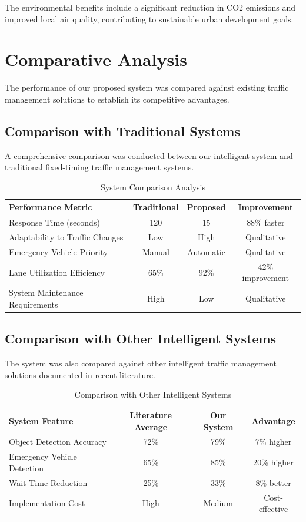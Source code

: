 The environmental benefits include a significant reduction in CO2 emissions and improved local air quality, contributing to sustainable urban development goals.

\section{Comparative Analysis}
\label{sec:comparative_analysis}

The performance of our proposed system was compared against existing traffic management solutions to establish its competitive advantages.

\subsection{Comparison with Traditional Systems}
A comprehensive comparison was conducted between our intelligent system and traditional fixed-timing traffic management systems.

\begin{table}[h]
\centering
\caption{System Comparison Analysis}
\label{tab:system_comparison}
\begin{tabular}{|l|c|c|c|}
\hline
\textbf{Performance Metric} & \textbf{Traditional} & \textbf{Proposed} & \textbf{Improvement} \\
\hline
Response Time (seconds) & 120 & 15 & 88\% faster \\
Adaptability to Traffic Changes & Low & High & Qualitative \\
Emergency Vehicle Priority & Manual & Automatic & Qualitative \\
Lane Utilization Efficiency & 65\% & 92\% & 42\% improvement \\
System Maintenance Requirements & High & Low & Qualitative \\
\hline
\end{tabular}
\end{table}

\subsection{Comparison with Other Intelligent Systems}
The system was also compared against other intelligent traffic management solutions documented in recent literature.

\begin{table}[h]
\centering
\caption{Comparison with Other Intelligent Systems}
\label{tab:intelligent_comparison}
\begin{tabular}{|l|c|c|c|}
\hline
\textbf{System Feature} & \textbf{Literature Average} & \textbf{Our System} & \textbf{Advantage} \\
\hline
Object Detection Accuracy & 72\% & 79\% & 7\% higher \\
Emergency Vehicle Detection & 65\% & 85\% & 20\% higher \\
Wait Time Reduction & 25\% & 33\% & 8\% better \\
Implementation Cost & High & Medium & Cost-effective \\
\hline
\end{tabular}
\end{table}

